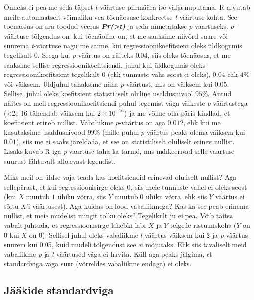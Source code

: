 \documentclass[
]{book}
\begin{document}
Õnneks ei pea me seda täpset \emph{t}-väärtuse piirmäära ise välja nuputama. R arvutab meile automaatselt võimaliku vea tõenäosuse konkreetse \emph{t}-väärtuse kohta. See tõenäosus on ära toodud veerus \textbf{\emph{Pr(\textgreater\textbar t\textbar)}} ja seda nimetatakse \emph{p}-väärtuseks. \emph{p}-väärtuse tõlgendus on: kui tõenäoline on, et me saaksime niivõrd suure või suurema \emph{t}-väärtuse nagu me saime, kui regressioonikoefitsient oleks üldkogumis tegelikult \(0\). Seega kui \emph{p}-väärtus on näiteks \(0.04\), siis oleks tõenäosus, et me saaksime sellise regressioonikoefitsiendi, juhul kui üldkogumis oleks regressioonikoefitsient tegelikult \(0\) (ehk tunnuste vahe seost ei oleks), \(0.04\) ehk \(4\)\% või väiksem. Üldjuhul tahaksime näha \emph{p}-väärtust, mis on väiksem kui \(0.05\). Sellisel juhul oleks koefitsient statistiliselt oluline usaldusnivool \(95\%\). Antud näites on meil regressioonikoefitsiendi puhul tegemist väga väikeste \emph{p} väärtustega (\textless2e-16 tähendab väiksem kui \(2\times10^{-16}\)) ja me võime olla päris kindlad, et koefitsient erineb nullist. Vabaliikme \emph{p}-väärtus on aga \(0.012\), ehk kui me kasutaksime usaldusnivood \(99\%\) (mille puhul \emph{p}-väärtus peaks olema väiksem kui \(0.01\)), siis me ei saaks järeldada, et see on statistiliselt oluliselt erinev nullist. Lisaks kuvab R iga \emph{p}-väärtuse taha ka tärnid, mis indikeerivad selle väärtuse suurust lähtuvalt allolevast legendist.

Miks meil on üldse vaja teada kas koefitsiendid erinevad oluliselt nullist? Aga sellepärast, et kui regressioonisirge oleks \(0\), siis meie tunnuste vahel ei oleks seost (kui \(X\) muutub \(1\) ühiku võrra, siis \(Y\) muutub \(0\) ühiku võrra, ehk siis \(Y\) väärtus ei sõltu \(X\)'i väärtusest). Aga kuidas on lood vabaliikmega? Kas ka see peab erinema nullist, et meie mudelist mingit tolku oleks? Tegelikult ju ei pea. Võib täitsa vabalt juhtuda, et regressioonisirge lähebki läbi \(X\) ja \(Y\) telgede ristumiskoha (\(Y\) on \(0\) kui \(X\) on \(0\)). Sellisel juhul oleks vabaliikme \emph{t}-väärtus väiksem kui \(2\) ja \emph{p}-väärtus suurem kui 0.05, kuid mudeli tõlgendust see ei mõjutaks. Ehk siis tavaliselt meid vabaliikme \emph{p} ja \emph{t} väärtused väga ei huvita. Küll aga peaks jälgima, et standardviga väga suur (võrreldes vabaliikme endaga) ei oleks.

\hypertarget{juxe4uxe4kide-standardviga}{%
\subsection{Jääkide standardviga}\label{juxe4uxe4kide-standardviga}}
\end{document}
